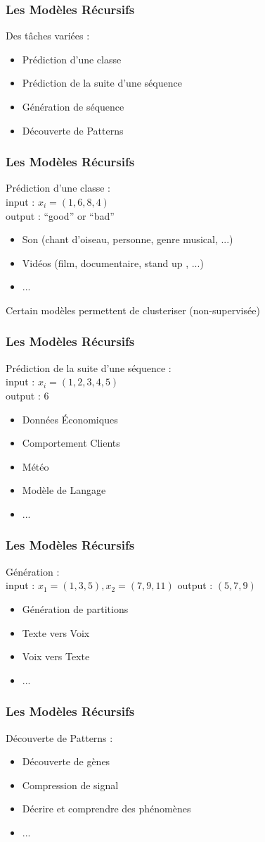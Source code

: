 \begin{frame}
  \frametitle{Les Modèles Récursifs}
  Des tâches variées :
  \begin{itemize}
  \item Prédiction d'une classe
  \item Prédiction de la suite d'une séquence
  \item Génération de séquence
  \item Découverte de Patterns
  \end{itemize}
\end{frame}

\begin{frame}
  \frametitle{Les Modèles Récursifs}
  Prédiction d'une classe : \\
  input : $x_i=(1,6,8,4)$ \\
  output : ``good'' or ``bad''
  \begin{itemize}
  \item Son (chant d'oiseau, personne, genre musical, ...)
  \item Vidéos (film, documentaire, stand up , ...)
  \item ...
  \end{itemize}
  Certain modèles permettent de clusteriser (non-supervisée)
\end{frame}

\begin{frame}
  \frametitle{Les Modèles Récursifs}
  Prédiction de la suite d'une séquence : \\
  input : $x_i=(1,2,3,4,5)$ \\
  output : 6
  \begin{itemize}
  \item Données Économiques
  \item Comportement Clients
  \item Météo
  \item Modèle de Langage
  \item ...
  \end{itemize}
\end{frame}

\begin{frame}
  \frametitle{Les Modèles Récursifs}
  Génération : \\
  input : $x_1=(1,3,5),x_2=(7,9,11)$
  output : $(5,7,9)$
  \begin{itemize}
  \item Génération de partitions
  \item Texte vers Voix
  \item Voix vers Texte
  \item ...
  \end{itemize}
\end{frame}

\begin{frame}
  \frametitle{Les Modèles Récursifs}
  Découverte de Patterns :
  \begin{itemize}
  \item Découverte de gènes
  \item Compression de signal
  \item Décrire et comprendre des phénomènes
  \item ...
  \end{itemize}
\end{frame}
